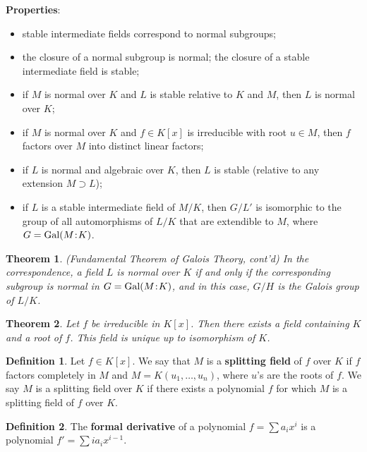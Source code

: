 \documentclass[11pt]{amsart}
\newtheorem*{theorem*}{Theorem}
\theoremstyle{definition}
\newtheorem*{definition*}{Definition}
\renewcommand\:{\colon}
\newcommand{\1}{\mathds{1}}
\newcommand{\Gal}[2]{\text{Gal}(#1 \hspace{-.2em} : \hspace{-.2em} #2)}
\begin{document}
\noindent \textbf{Properties}:
\begin{itemize}[leftmargin=*]\setlength\itemsep{0em}
	\item stable intermediate fields correspond to normal subgroups;
	\item the closure of a normal subgroup is normal; the closure of a stable intermediate field is stable;
	\item if $M$ is normal over $K$ and $L$ is stable relative to $K$ and $M$, then $L$ is normal over $K$;
	\item if $M$ is normal over $K$ and $f \in K[x]$ is irreducible with root $u \in M$, then $f$ factors over $M$ into distinct linear factors;
	\item if $L$ is normal and algebraic over $K$, then $L$ is stable (relative to any extension $M \supset L$);
	\item if $L$ is a stable intermediate field of $M/K$, then $G/L'$ is isomorphic to the group of all automorphisms of $L/K$ that are extendible to $M$, where $G = \Gal MK$.
\end{itemize}

\begin{theorem*}
	\textnormal{(Fundamental Theorem of Galois Theory, cont'd)} In the correspondence, a field $L$ is normal over $K$ if and only if the corresponding subgroup is normal in $G = \Gal MK$, and in this case, $G/H$ is the Galois group of $L/K$.
\end{theorem*}
\vskip40pt



\begin{theorem*}
	Let $f$ be irreducible in $K[x]$. Then there exists a field containing $K$ and a root of $f$. This field is unique up to isomorphism of $K$.
\end{theorem*}

\begin{definition*}
	Let $f \in K[x]$. We say that $M$ is a \textbf{splitting field} of $f$ over $K$ if $f$ factors completely in $M$ and $M = K(u_1, \dots, u_n)$, where $u$'s are the roots of $f$. We say $M$ is a splitting field over $K$ if there exists a polynomial $f$ for which $M$ is a splitting field of $f$ over $K$.
\end{definition*}

\begin{definition*}
	The \textbf{formal derivative} of a polynomial $f = \sum a_ix^i$ is a polynomial $f' = \sum ia_ix^{i-1}$. 
\end{definition*}
\end{document}
